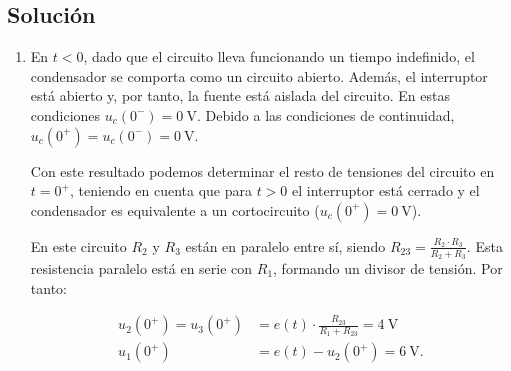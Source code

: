 \subsection*{Solución}

\begin{enumerate}
\item

  En $t < 0$, dado que el circuito lleva funcionando un tiempo
  indefinido, el condensador se comporta como un circuito
  abierto. Además, el interruptor está abierto y, por tanto, la fuente
  está aislada del circuito. En estas condiciones
  $u_c(0^-) = \qty{0}{\volt}$. Debido a las condiciones de
  continuidad, $u_c(0^+) = u_c(0^-) = \qty{0}{\volt}$.

\begin{minipage}{0.6\linewidth}
  Con este resultado podemos determinar el resto de tensiones del
  circuito en $t = 0^+$, teniendo en cuenta que para $t > 0$ el
  interruptor está cerrado y el condensador es equivalente a un
  cortocircuito ($u_c(0^+) = \qty{0}{\volt}$).
\end{minipage}
\begin{minipage}{0.4\linewidth}
\end{minipage}

En este circuito $R_2$ y $R_3$ están en paralelo entre sí, siendo
$R_{23} = \frac{R_2 \cdot R_3}{R_2 + R_3}$. Esta resistencia paralelo
está en serie con $R_1$, formando un divisor de tensión. Por tanto:

\begin{align*}
  u_2(0^+) = u_3(0^+) &= e(t) \cdot \frac{R_{23}}{R_1 + R_{23}} = \qty{4}{\volt}\\
  u_1(0^+) &= e(t) - u_2(0^+) = \qty{6}{\volt}.
\end{align*}


\end{enumerate}
